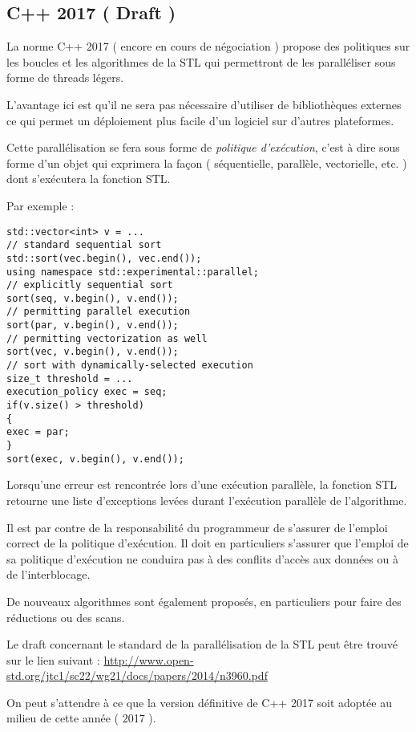 \documentclass[fleqn,11pt]{article}
\begin{document}
\subsection{C++ 2017 ( Draft )}

La norme C++ 2017 ( encore en cours de négociation ) propose des politiques sur les boucles
et les algorithmes de la STL qui permettront de les paralléliser sous forme de threads légers.

L'avantage ici est qu'il ne sera pas nécessaire d'utiliser de bibliothèques externes ce qui permet un
déploiement plus facile d'un logiciel sur d'autres plateformes.

Cette parallélisation se fera sous forme de \textsl{politique d'exécution}, c'est à dire sous
forme d'un objet qui exprimera la façon ( séquentielle, parallèle, vectorielle, etc. ) dont
s'exécutera la fonction STL.

Par exemple :
\begin{lstlisting}
std::vector<int> v = ...
// standard sequential sort
std::sort(vec.begin(), vec.end());
using namespace std::experimental::parallel;
// explicitly sequential sort
sort(seq, v.begin(), v.end());
// permitting parallel execution
sort(par, v.begin(), v.end());
// permitting vectorization as well
sort(vec, v.begin(), v.end());
// sort with dynamically-selected execution
size_t threshold = ...
execution_policy exec = seq;
if(v.size() > threshold)
{
exec = par;
}
sort(exec, v.begin(), v.end());
\end{lstlisting}

Lorsqu'une erreur est rencontrée lors d'une exécution parallèle, la fonction STL retourne
une liste d'exceptions levées durant l'exécution parallèle de l'algorithme.

Il est par contre de la responsabilité du programmeur de s'assurer de l'emploi correct de la politique
d'exécution. Il doit en particuliers s'assurer que l'emploi de sa politique d'exécution ne conduira pas
à des conflits d'accès aux données ou à de l'interblocage.

De nouveaux algorithmes sont également proposés, en particuliers pour faire des réductions ou des
scans.

Le draft  concernant le standard de la parallélisation de la STL peut être trouvé
sur le lien suivant :
\url{http://www.open-std.org/jtc1/sc22/wg21/docs/papers/2014/n3960.pdf}

On peut s'attendre à ce que la version définitive de C++ 2017 soit adoptée au milieu
de cette année ( 2017 ).
\end{document}
